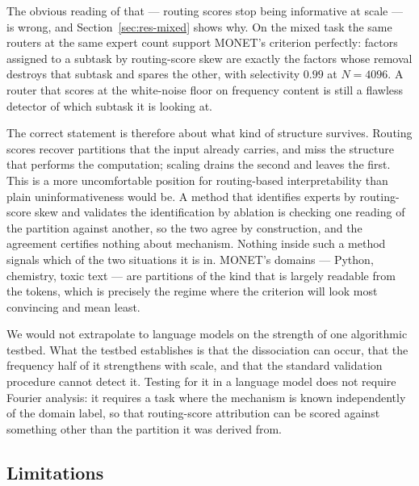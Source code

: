 The obvious reading of that --- routing scores stop being informative at scale
--- is wrong, and Section~\ref{sec:res-mixed} shows why. On the mixed task the
same routers at the same expert count support MONET's criterion perfectly:
factors assigned to a subtask by routing-score skew are exactly the factors
whose removal destroys that subtask and spares the other, with selectivity
$0.99$ at $N = 4096$. A router that scores at the white-noise floor on
frequency content is still a flawless detector of which subtask it is looking
at.

The correct statement is therefore about what kind of structure survives.
Routing scores recover partitions that the input already carries, and miss the
structure that performs the computation; scaling drains the second and leaves
the first. This is a more uncomfortable position for routing-based
interpretability than plain uninformativeness would be. A method that
identifies experts by routing-score skew and validates the identification by
ablation is checking one reading of the partition against another, so the two
agree by construction, and the agreement certifies nothing about mechanism.
Nothing inside such a method signals which of the two situations it is in.
MONET's domains --- Python, chemistry, toxic text --- are partitions of the
kind that is largely readable from the tokens, which is precisely the regime
where the criterion will look most convincing and mean least.

We would not extrapolate to language models on the strength of one algorithmic
testbed. What the testbed establishes is that the dissociation can occur, that
the frequency half of it strengthens with scale, and that the standard
validation procedure cannot detect it. Testing for it in a language model does
not require Fourier analysis: it requires a task where the mechanism is known
independently of the domain label, so that routing-score attribution can be
scored against something other than the partition it was derived from.

\subsection{Limitations}
\label{sec:limitations}


